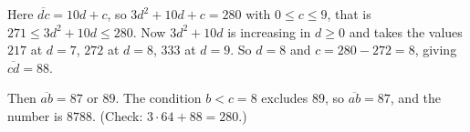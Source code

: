 Here $\overline{dc}=10d+c$, so $3d^2+10d+c=280$ with $0\le c\le9$, that is $271\le3d^2+10d\le280$. Now $3d^2+10d$ is increasing in $d\ge0$ and takes the values $217$ at $d=7$, $272$ at $d=8$, $333$ at $d=9$. So $d=8$ and $c=280-272=8$, giving $\overline{cd}=88$.

Then $\overline{ab}=87$ or $89$. The condition $b<c=8$ excludes $89$, so $\overline{ab}=87$, and the number is $\boxed{8788}$. (Check: $3\cdot64+88=280$.)
